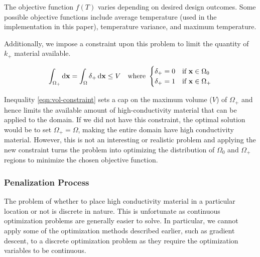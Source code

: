 The objective function $f(T)$ varies depending on desired design outcomes. Some possible objective functions include average temperature (used in the implementation in this paper), temperature variance, and maximum temperature.

Additionally, we impose a constraint upon this problem to limit the quantity of $k_+$ material available.

\begin{equation}
	\int_{\Omega_+}\dif\mathbf{x}=\int_{\Omega}\delta_+\dif\mathbf{x}\leq V\quad\text{where }\begin{cases}\delta_+ = 0 & \text{if }\mathbf{x}\in\Omega_0 \\ \delta_+ = 1 & \text{if }\mathbf{x}\in\Omega_+\end{cases}\label{eqn:vol-constraint}
\end{equation}

Inequality \eqref{eqn:vol-constraint} sets a cap on the maximum volume ($V$) of $\Omega_+$ and hence limits the available amount of high-conductivity material that can be applied to the domain. If we did not have this constraint, the optimal solution would be to set $\Omega_+=\Omega$, making the entire domain have high conductivity material. However, this is not an interesting or realistic problem and applying the new constraint turns the problem into optimizing the distribution of $\Omega_0$ and $\Omega_+$ regions to minimize the chosen objective function.

\subsubsection*{Penalization Process}
The problem of whether to place high conductivity material in a particular location or not is discrete in nature. This is unfortunate as continuous optimization problems are generally easier to solve. In particular, we cannot apply some of the optimization methods described earlier, such as gradient descent, to a discrete optimization problem as they require the optimization variables to be continuous.

